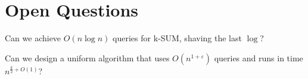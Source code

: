 \section{Open Questions}

Can we achieve \(O(n \log n)\) queries for k-SUM, shaving the last
\(\log{}\)?

Can we design a uniform algorithm that uses \(O(n^{1+ \varepsilon})\) queries and runs
in time \(n^{\frac{k}{2}+O(1)}\)?

